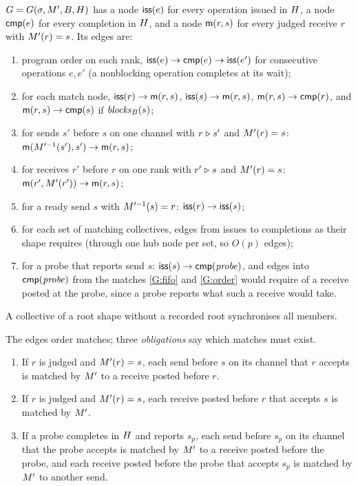 \begin{definition}
$G=G(\sigma,M',B,H)$ has a node $\mathsf{iss}(e)$ for every operation issued
in $H$, a node $\mathsf{cmp}(e)$ for every completion in $H$, and a node $\mathsf{m}(r,s)$
for every judged receive $r$ with $M'(r)=s$. Its edges are:
\begin{enumerate}[leftmargin=*,label=(G\arabic*)]
\item\label{G:po} program order on each rank, $\mathsf{iss}(e)\to\mathsf{cmp}(e)\to\mathsf{iss}(e')$ for
  consecutive operations $e,e'$ (a nonblocking operation completes at its wait);
\item\label{G:match} for each match node, $\mathsf{iss}(r)\to\mathsf{m}(r,s)$,
  $\mathsf{iss}(s)\to\mathsf{m}(r,s)$, $\mathsf{m}(r,s)\to\mathsf{cmp}(r)$, and $\mathsf{m}(r,s)\to\mathsf{cmp}(s)$ if
  $\mathit{blocks}_B(s)$;
\item\label{G:fifo} for sends $s'$ before $s$ on one channel with $r\mathrel{\triangleright} s'$ and
  $M'(r)=s$: $\mathsf{m}(M'^{-1}(s'),s')\to\mathsf{m}(r,s)$;
\item\label{G:order} for receives $r'$ before $r$ on one rank with $r'\mathrel{\triangleright} s$ and
  $M'(r)=s$: $\mathsf{m}(r',M'(r'))\to\mathsf{m}(r,s)$;
\item\label{G:ready} for a ready send $s$ with $M'^{-1}(s)=r$: $\mathsf{iss}(r)\to\mathsf{iss}(s)$;
\item\label{G:coll} for each set of matching collectives, edges from issues to completions
  as their shape requires (through one hub node per set, so $O(p)$ edges);
\item\label{G:probe} for a probe that reports send $s$: $\mathsf{iss}(s)\to\mathsf{cmp}(\mathit{probe})$, and
  edges into $\mathsf{cmp}(\mathit{probe})$ from the matches \ref{G:fifo} and \ref{G:order} would
  require of a receive posted at the probe, since a probe reports what such a receive would
  take.
\end{enumerate}
A collective of a root shape without a recorded root synchronises all members.
\end{definition}

The edges order matches; three \emph{obligations} say which matches must exist.
\begin{enumerate}[leftmargin=*,label=(O\arabic*)]
\item\label{O:fifo} If $r$ is judged and $M'(r)=s$, each send before $s$ on its channel that
  $r$ accepts is matched by $M'$ to a receive posted before $r$.
\item\label{O:order} If $r$ is judged and $M'(r)=s$, each receive posted before $r$ that
  accepts $s$ is matched by $M'$.
\item\label{O:probe} If a probe completes in $H$ and reports $s_p$, each send before $s_p$
  on its channel that the probe accepts is matched by $M'$ to a receive posted before the
  probe, and each receive posted before the probe that accepts $s_p$ is matched by $M'$ to
  another send.
\end{enumerate}

